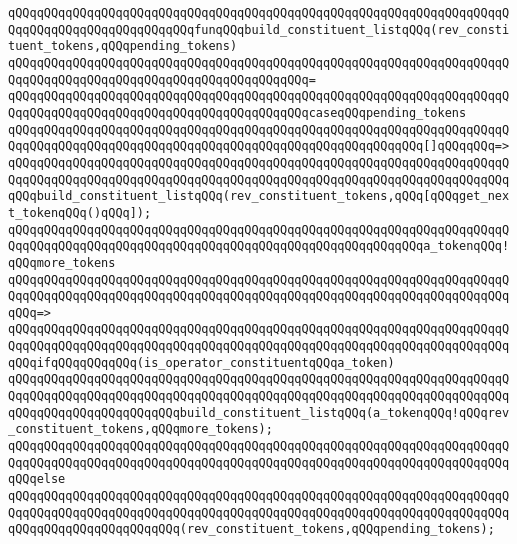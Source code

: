 \verb|qQQqqQQqqQQqqQQqqQQqqQQqqQQqqQQqqQQqqQQqqQQqqQQqqQQqqQQqqQQqqQQqqQQqqQQqqQQqqQQqqQQqqQQqqQQqqQQqfunqQQqbuild_constituent_listqQQq(rev_constituent_tokens,qQQqpending_tokens)|\newline
\verb|qQQqqQQqqQQqqQQqqQQqqQQqqQQqqQQqqQQqqQQqqQQqqQQqqQQqqQQqqQQqqQQqqQQqqQQqqQQqqQQqqQQqqQQqqQQqqQQqqQQqqQQqqQQqqQQq=|\newline
\verb|qQQqqQQqqQQqqQQqqQQqqQQqqQQqqQQqqQQqqQQqqQQqqQQqqQQqqQQqqQQqqQQqqQQqqQQqqQQqqQQqqQQqqQQqqQQqqQQqqQQqqQQqqQQqqQQqcaseqQQqpending_tokens|\newline
\newline
\verb|qQQqqQQqqQQqqQQqqQQqqQQqqQQqqQQqqQQqqQQqqQQqqQQqqQQqqQQqqQQqqQQqqQQqqQQqqQQqqQQqqQQqqQQqqQQqqQQqqQQqqQQqqQQqqQQqqQQqqQQqqQQqqQQq[]qQQqqQQq=>|\newline
\verb|qQQqqQQqqQQqqQQqqQQqqQQqqQQqqQQqqQQqqQQqqQQqqQQqqQQqqQQqqQQqqQQqqQQqqQQqqQQqqQQqqQQqqQQqqQQqqQQqqQQqqQQqqQQqqQQqqQQqqQQqqQQqqQQqqQQqqQQqqQQqqQQqbuild_constituent_listqQQq(rev_constituent_tokens,qQQq[qQQqget_next_tokenqQQq()qQQq]);|\newline
\newline
\verb|qQQqqQQqqQQqqQQqqQQqqQQqqQQqqQQqqQQqqQQqqQQqqQQqqQQqqQQqqQQqqQQqqQQqqQQqqQQqqQQqqQQqqQQqqQQqqQQqqQQqqQQqqQQqqQQqqQQqqQQqqQQqqQQqa_tokenqQQq!qQQqmore_tokens|\newline
\verb|qQQqqQQqqQQqqQQqqQQqqQQqqQQqqQQqqQQqqQQqqQQqqQQqqQQqqQQqqQQqqQQqqQQqqQQqqQQqqQQqqQQqqQQqqQQqqQQqqQQqqQQqqQQqqQQqqQQqqQQqqQQqqQQqqQQqqQQqqQQqqQQq=>|\newline
\verb|qQQqqQQqqQQqqQQqqQQqqQQqqQQqqQQqqQQqqQQqqQQqqQQqqQQqqQQqqQQqqQQqqQQqqQQqqQQqqQQqqQQqqQQqqQQqqQQqqQQqqQQqqQQqqQQqqQQqqQQqqQQqqQQqqQQqqQQqqQQqqQQqifqQQqqQQqqQQq(is_operator_constituentqQQqa_token)|\newline
\newline
\verb|qQQqqQQqqQQqqQQqqQQqqQQqqQQqqQQqqQQqqQQqqQQqqQQqqQQqqQQqqQQqqQQqqQQqqQQqqQQqqQQqqQQqqQQqqQQqqQQqqQQqqQQqqQQqqQQqqQQqqQQqqQQqqQQqqQQqqQQqqQQqqQQqqQQqqQQqqQQqqQQqqQQqbuild_constituent_listqQQq(a_tokenqQQq!qQQqrev_constituent_tokens,qQQqmore_tokens);|\newline
\verb|qQQqqQQqqQQqqQQqqQQqqQQqqQQqqQQqqQQqqQQqqQQqqQQqqQQqqQQqqQQqqQQqqQQqqQQqqQQqqQQqqQQqqQQqqQQqqQQqqQQqqQQqqQQqqQQqqQQqqQQqqQQqqQQqqQQqqQQqqQQqqQQqelse|\newline
\verb|qQQqqQQqqQQqqQQqqQQqqQQqqQQqqQQqqQQqqQQqqQQqqQQqqQQqqQQqqQQqqQQqqQQqqQQqqQQqqQQqqQQqqQQqqQQqqQQqqQQqqQQqqQQqqQQqqQQqqQQqqQQqqQQqqQQqqQQqqQQqqQQqqQQqqQQqqQQqqQQqqQQq(rev_constituent_tokens,qQQqpending_tokens);|\newline
